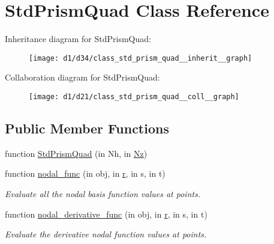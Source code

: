 \hypertarget{class_std_prism_quad}{}\section{Std\+Prism\+Quad Class Reference}
\label{class_std_prism_quad}


Inheritance diagram for Std\+Prism\+Quad\+:
\nopagebreak
\begin{figure}[H]
\begin{center}
\leavevmode
\texttt{[image: d1/d34/class\_std\_prism\_quad\_\_inherit\_\_graph]}
\end{center}
\end{figure}


Collaboration diagram for Std\+Prism\+Quad\+:
\nopagebreak
\begin{figure}[H]
\begin{center}
\leavevmode
\texttt{[image: d1/d21/class\_std\_prism\_quad\_\_coll\_\_graph]}
\end{center}
\end{figure}
\subsection*{Public Member Functions}
\begin{DoxyCompactItemize}
\item 
function \hyperlink{class_std_prism_quad_a558f1aa00ffa8172acbe797ce8eac96c}{Std\+Prism\+Quad} (in Nh, in \hyperlink{class_std_prism_quad_a62d7fa646d7c8cb0cfbebbb0b3cde473}{Nz})
\item 
function \hyperlink{class_std_prism_quad_a30858da9a06b5b3d5d0a4ba68f82b5b1}{nodal\+\_\+func} (in obj, in \hyperlink{class_std_prism_quad_ab1bbbef07ec9f1a9f0727140c5c26f39}{r}, in s, in t)
\begin{DoxyCompactList}\small\item\em Evaluate all the nodal basis function values at points. \end{DoxyCompactList}\item 
function \hyperlink{class_std_prism_quad_ad80b05ede21880df14d755647d932f87}{nodal\+\_\+derivative\+\_\+func} (in obj, in \hyperlink{class_std_prism_quad_ab1bbbef07ec9f1a9f0727140c5c26f39}{r}, in s, in t)
\begin{DoxyCompactList}\small\item\em Evaluate the derivative nodal function values at points. \end{DoxyCompactList}\end{DoxyCompactItemize}
